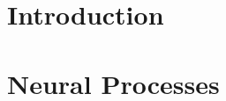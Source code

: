 \documentclass[12pt]{report}
\date{\today}
\begin{document}
\createnotestitlepage 


\chapter{Introduction}

\chapter{Neural Processes}

% 
% 
% 


\printbibliography[heading=bibintoc]{}



\newpage
 




\end{document}
